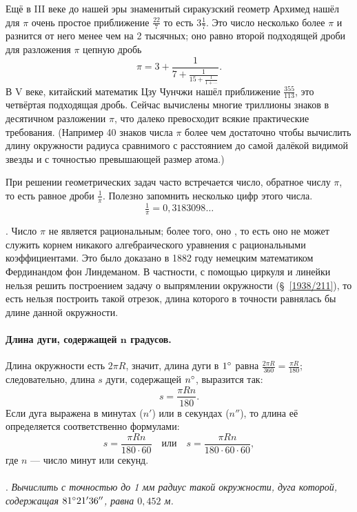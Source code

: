 Ещё в III веке до нашей эры знаменитый сиракузский геометр Архимед нашёл для $\pi$ очень простое приближение $\tfrac{22}7$ то есть $3\tfrac17$.
Это число несколько более $\pi$ и разнится от него менее чем на 2 тысячных;
оно равно второй подходящей дроби для разложения $\pi$ цепную дробь
\[\pi=3+\frac{1}{7+\frac{1}{15+\frac{1}{1+\cdots}}}.\]
В V веке, китайский математик Цзу Чунчжи нашёл приближение $\tfrac{355}{113}$, это четвёртая подходящая дробь. 
Сейчас вычислены многие триллионы знаков в десятичном разложении $\pi$, что далеко превосходит всякие практические требования.
(Например 40 знаков числа $\pi$ более чем достаточно чтобы вычислить длину окружности радиуса сравнимого с расстоянием до самой далёкой видимой звезды и с точностью превышающей размер атома.) 

При решении геометрических задач часто встречается число, обратное числу $\pi$, то есть равное дроби $\tfrac1\pi$.
Полезно запомнить несколько цифр этого числа.
\[\tfrac1\pi = 0{,}3183098\dots\]

\smallskip
{}.
Число $\pi$ не является рациональным;
более того, оно , то есть оно не может служить корнем никакого алгебраического уравнения с рациональными коэффициентами.
Это было доказано в 1882 году немецким математиком Фердинандом фон Линдеманом.
В частности, с помощью циркуля и линейки нельзя решить построением задачу о выпрямлении окружности (§~\ref{1938/211}), то есть нельзя построить такой отрезок, длина которого в точности равнялась бы длине данной окружности.


\paragraph{Длина дуги, содержащей $\bm{n}$ градусов.}\label{1938/239}
Длина окружности есть $2\pi R$, значит, длина дуги в $1\degree$ равна $\frac{2\pi R}{360}=\frac{\pi R}{180}$; следовательно, длина $s$ дуги, содержащей $n\degree$, выразится так:
\[s=\frac{\pi R n}{180}.\]
Если дуга выражена в минутах ($n'$) или в секундах ($n''$), то длина её определяется соответственно формулами:
\[s=\frac{\pi R n}{180\cdot 60}
\quad\text{или}\quad
s=\frac{\pi R n}{180\cdot 60\cdot 60},\]
где $n$ — число минут или секунд.

\paragraph{}\label{1938/240}
.
\emph{Вычислить с точностью до 1 мм радиус такой окружности, дуга которой, содержащая $81\degree 21'36''$, равна $0{,}452$ м.}

